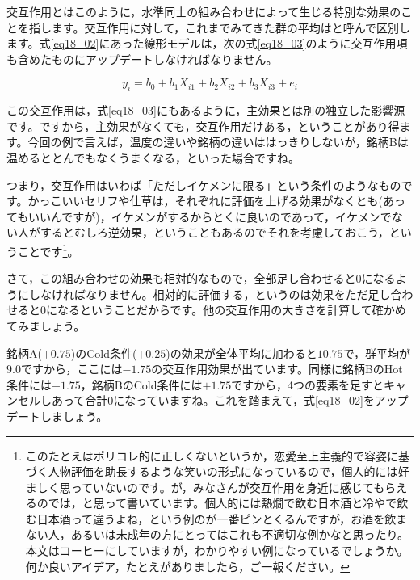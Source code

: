 \documentclass{ltjbook}
\begin{document}
交互作用とはこのように，水準同士の組み合わせによって生じる特別な効果のことを指します。交互作用に対して，これまでみてきた群の平均はと呼んで区別します。式\ref{eq18_02}にあった線形モデルは，次の式\ref{eq18_03}のように交互作用項も含めたものにアップデートしなければなりません。

\begin{equation}
	\label{eq18_03}
	y_i = b_0 + b_1 X_{i1}+ b_2 X_{i2} + b_3 X_{i3} + e_{i}
\end{equation}

この交互作用は，式\ref{eq18_03}にもあるように，主効果とは別の独立した影響源です。ですから，主効果がなくても，交互作用だけある，ということがあり得ます。今回の例で言えば，温度の違いや銘柄の違いははっきりしないが，銘柄Bは温めるととんでもなくうまくなる，といった場合ですね。

つまり，交互作用はいわば「ただしイケメンに限る」という条件のようなものです。かっこいいセリフや仕草は，それぞれに評価を上げる効果がなくとも(あってもいいんですが)，イケメンがするからとくに良いのであって，イケメンでない人がするとむしろ逆効果，ということもあるのでそれを考慮しておこう，ということです\footnote{このたとえはポリコレ的に正しくないというか，恋愛至上主義的で容姿に基づく人物評価を助長するような笑いの形式になっているので，個人的には好ましく思っていないのです。が，みなさんが交互作用を身近に感じてもらえるのでは，と思って書いています。個人的には熱燗で飲む日本酒と冷やで飲む日本酒って違うよね，という例のが一番ピンとくるんですが，お酒を飲まない人，あるいは未成年の方にとってはこれも不適切な例かなと思ったり。本文はコーヒーにしていますが，わかりやすい例になっているでしょうか。何か良いアイデア，たとえがありましたら，ご一報ください。}。

さて，この組み合わせの効果も相対的なもので，全部足し合わせると$0$になるようにしなければなりません。相対的に評価する，というのは効果をただ足し合わせると$0$になるということだからです。他の交互作用の大きさを計算して確かめてみましょう。

銘柄A($+0.75$)のCold条件($+0.25$)の効果が全体平均に加わると$10.75$で，群平均が$9.0$ですから，ここには$-1.75$の交互作用効果が出ています。同様に銘柄BのHot条件には$-1.75$，銘柄BのCold条件には$+1.75$ですから，4つの要素を足すとキャンセルしあって合計$0$になっていますね。これを踏まえて，式\ref{eq18_02}をアップデートしましょう。
\end{document}
